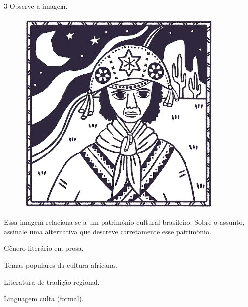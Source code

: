 \num{3}  Observe a imagem.

\begin{figure}[htpb!]
\centering
\includegraphics[width=.5\textwidth]{./imgs/art43.png}
\end{figure}

Essa imagem relaciona-se a um patrimônio cultural brasileiro. Sobre o assunto, assinale uma alternativa que descreve corretamente esse patrimônio.

\begin{escolha}
\item
  Gênero literário em prosa.
\item
  Temas populares da cultura africana.
\item
  Literatura de tradição regional.
\item
  Linguagem culta (formal).
\end{escolha}



